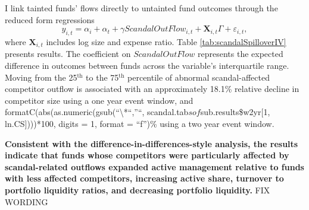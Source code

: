 \documentclass[openany]{book}
\theoremstyle{definition}
\theoremstyle{definition}
\theoremstyle{definition}
\theoremstyle{remark}
\begin{document}
I link tainted funds' flows directly to untainted fund outcomes through
the reduced form regressions \begin{equation}
    y_{i,t}=\alpha_i+\alpha_t+\gamma ScandalOutFlow_{i,t} + \mathbf{X}_{i,t}\Gamma + \varepsilon_{i,t},
\end{equation} where \(\mathbf{X}_{i,t}\) includes log size and expense
ratio. Table \ref{tab:scandalSpilloverIV} presents results. The
coefficient on \(ScandalOutFlow\) represents the expected difference in
outcomes between funds across the variable's interquartile range. Moving
from the 25\(^{\text{th}}\) to the 75\(^{\text{th}}\) percentile of
abnormal scandal-affected competitor outflow is associated with an
approximately 18.1\% relative decline in competitor size using a one
year event window, and
formatC(abs(as.numeric(gsub(``\textbackslash{}*``,''``,
scandal.tab\(sof\)sub.results\$w2yr{[}1, ln.CS{]})))*100, digits = 1,
format = ``f'')\% using a two year event window.

\textbf{Consistent with the difference-in-differences-style analysis,
the results indicate that funds whose competitors were particularly
affected by scandal-related outflows expanded active management relative
to funds with less affected competitors, increasing active share,
turnover to portfolio liquidity ratios, and decreasing portfolio
liquidity.} FIX WORDING
\end{document}

